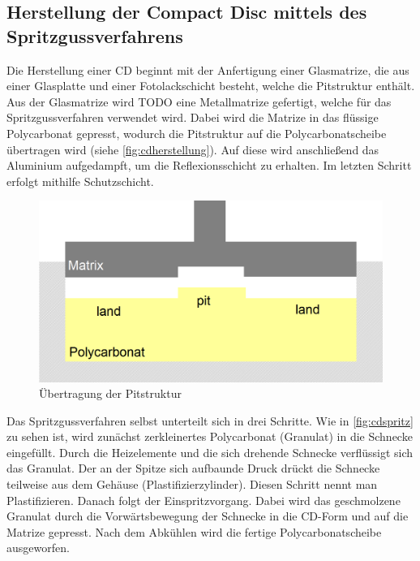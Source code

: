\subsection{Herstellung der Compact Disc mittels des Spritzgussverfahrens}
\label{subsec:cdherstellung}

Die Herstellung einer CD beginnt mit der Anfertigung einer Glasmatrize, die aus
einer Glasplatte und einer Fotolackschicht besteht, welche die Pitstruktur
enthält. Aus der Glasmatrize wird TODO eine Metallmatrize gefertigt, welche für
das Spritzgussverfahren verwendet wird. Dabei wird die Matrize in das flüssige
Polycarbonat gepresst, wodurch die Pitstruktur auf die Polycarbonatscheibe
übertragen wird (siehe \autoref{fig:cdherstellung}). Auf diese wird anschließend
das Aluminium aufgedampft, um die Reflexionsschicht zu erhalten. Im letzten
Schritt erfolgt mithilfe Schutzschicht. \cite{cdp}

\begin{figure}[h]
    \begin{center}
        \begin{minipage}[t]{\textwidth}
            \begin{center}
                \includegraphics[height=0.1\textheight]{Bilder/Optische_Datentraeger_Die_Compact_Disc/Herstellung/cdherstellung.png}
                \caption[Übertragung der Pitstruktur \newline \url{http://daten.didaktikchemie.uni-bayreuth.de/umat/cd_dvd/spritzguss.gif} (zuletzt aufgerufen am 07.08.2015)]{Übertragung der Pitstruktur}
                \label{fig:cdherstellung}
            \end{center}
        \end{minipage}
    \end{center}
\end{figure}

Das Spritzgussverfahren selbst unterteilt sich in drei Schritte. Wie in
\autoref{fig:cdspritz} zu sehen ist, wird zunächst zerkleinertes Polycarbonat
(Granulat) in die Schnecke eingefüllt. Durch die Heizelemente und die sich
drehende Schnecke verflüssigt sich das Granulat. Der an der Spitze sich
aufbaunde Druck drückt die Schnecke teilweise aus dem Gehäuse
(Plastifizierzylinder). Diesen Schritt nennt man Plastifizieren. Danach folgt
der Einspritzvorgang. Dabei wird das geschmolzene Granulat durch die
Vorwärtsbewegung der Schnecke in die CD-Form und auf die Matrize gepresst. Nach
dem Abkühlen wird die fertige Polycarbonatscheibe ausgeworfen. \cite{cdpf}

